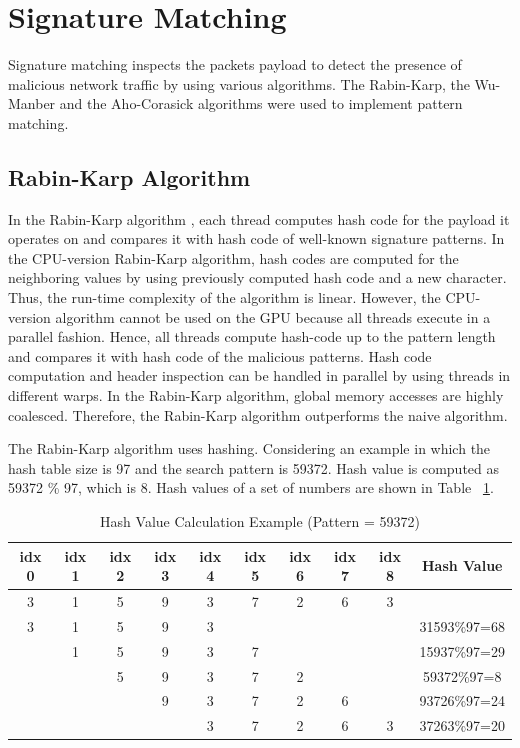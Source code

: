 \section{Signature Matching}
Signature matching inspects the packets payload to detect the presence of malicious network traffic by using various algorithms. The Rabin-Karp, the Wu-Manber and the Aho-Corasick algorithms were used to implement pattern matching.

\subsection{Rabin-Karp Algorithm}
In the Rabin-Karp algorithm \cite{bib19}, each thread computes hash code for the payload it operates on and compares it with hash code of well-known signature patterns. In the CPU-version Rabin-Karp algorithm, hash codes are computed for the neighboring values by using previously computed hash code and a new character. Thus, the run-time complexity of the algorithm is linear. However, the CPU-version algorithm cannot be used on the GPU because all threads execute in a parallel fashion. Hence, all threads compute hash-code up to the pattern length and compares it with hash code of the malicious patterns. Hash code computation and header inspection can be handled in parallel by using threads in different warps. In the Rabin-Karp algorithm, global memory accesses are highly coalesced. Therefore, the Rabin-Karp algorithm outperforms the naive algorithm.

The Rabin-Karp algorithm uses hashing. Considering an example in which the hash table size is 97 and the search pattern is 59372. Hash value is computed as 59372 \% 97, which is 8. Hash values of a set of numbers are shown in Table ~\ref{tab:hashvalue}.

\begin {table}[H]
\caption {Hash Value Calculation Example (Pattern = 59372)} \label{tab:hashvalue}
\begin{tabular}{|c|c|c|c|c|c|c|c|c|c|}
	\midrule
	idx 0 & idx 1 & idx 2 & idx 3 & idx 4 & idx 5 & idx 6 & idx 7 & idx 8 & Hash Value\\
	\midrule
	3 & 1 & 5 & 9 & 3 & 7 & 2 & 6 & 3 &\\
	\midrule
	3 & 1 & 5 & 9 & 3 & & & & & 31593\%97=68 \\
	\midrule
	& 1 & 5 & 9 & 3 & 7 & & & & 15937\%97=29\\
	\midrule
	&   & 5 & 9 & 3 & 7 & 2 & & & 59372\%97=8 \\
	\midrule
	&   &   & 9 & 3 & 7 & 2 & 6 & & 93726\%97=24 \\
	\midrule
	&   &   &   & 3 & 7 & 2 & 6 & 3 & 37263\%97=20 \\
	\midrule
\end{tabular}
\end {table}
\squeezeup

